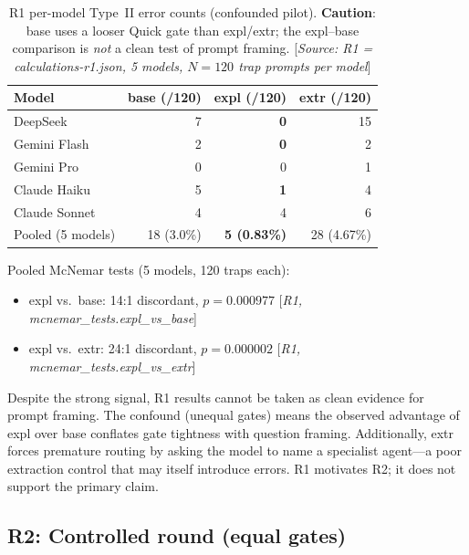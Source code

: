 \documentclass[11pt,a4paper]{article}
\begin{document}
\begin{table}[htbp]
\centering
\caption{R1 per-model Type~II error counts (confounded pilot).
  \textbf{Caution}: \textsf{base} uses a looser Quick gate than
  \textsf{expl}/\textsf{extr}; the expl--base comparison is
  \emph{not} a clean test of prompt framing.
  [\emph{Source: R1 = calculations-r1.json, 5 models,
  $N = 120$ trap prompts per model}]}
\label{tab:r1}
\smallskip
\begin{tabular}{@{}lrrr@{}}
\toprule
Model & \textsf{base} (/120) & \textsf{expl} (/120) & \textsf{extr} (/120) \\
\midrule
DeepSeek       &  7 & \textbf{0}  & 15 \\
Gemini Flash   &  2 & \textbf{0}  &  2 \\
Gemini Pro     &  0 &             0  &  1 \\
Claude Haiku   &  5 & \textbf{1}  &  4 \\
Claude Sonnet  &  4 &             4  &  6 \\
\midrule
Pooled (5 models) & 18 (3.0\%) & \textbf{5 (0.83\%)} & 28 (4.67\%) \\
\bottomrule
\end{tabular}
\end{table}

\noindent Pooled McNemar tests (5 models, 120 traps each):
\begin{itemize}[noitemsep]
  \item \textsf{expl} vs.\ \textsf{base}: 14:1 discordant,
    $p = 0.000977$ [\emph{R1, mcnemar\_tests.expl\_vs\_base}]
  \item \textsf{expl} vs.\ \textsf{extr}: 24:1 discordant,
    $p = 0.000002$ [\emph{R1, mcnemar\_tests.expl\_vs\_extr}]
\end{itemize}

Despite the strong signal, R1 results cannot be taken as clean evidence for
prompt framing.  The confound (unequal gates) means the observed advantage
of \textsf{expl} over \textsf{base} conflates gate tightness with question
framing.  Additionally, \textsf{extr} forces premature routing by asking the
model to name a specialist agent---a poor extraction control that may itself
introduce errors.  R1 motivates R2; it does not support the primary claim.

\subsection{R2: Controlled round (equal gates)}
\end{document}
